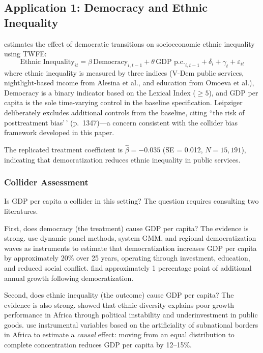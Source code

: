 \documentclass[
]{article}
\begin{document}
\subsection{\texorpdfstring{Application 1: Democracy and Ethnic
Inequality
\label{sec:app_leipziger}}{Application 1: Democracy and Ethnic Inequality }}\label{application-1-democracy-and-ethnic-inequality}

\citet{leipziger2024} estimates the effect of democratic transitions on
socioeconomic ethnic inequality using TWFE: \[
\text{Ethnic Inequality}_{it} = \beta \, \text{Democracy}_{i,t-1} + \theta \, \text{GDP p.c.}_{i,t-1} + \delta_i + \gamma_t + \varepsilon_{it}
\] where ethnic inequality is measured by three indices (V-Dem public
services, nightlight-based income from Alesina et al., and education
from Omoeva et al.), Democracy is a binary indicator based on the
Lexical Index (\(\geq 5\)), and GDP per capita is the sole time-varying
control in the baseline specification. Leipziger deliberately excludes
additional controls from the baseline, citing ``the risk of
posttreatment bias'\,' (p.~1347)---a concern consistent with the
collider bias framework developed in this paper.

The replicated treatment coefficient is \(\hat\beta = -0.035\) (SE =
0.012, \(N = 15,191\)), indicating that democratization reduces ethnic
inequality in public services.

\subsubsection{Collider Assessment}\label{collider-assessment}

Is GDP per capita a collider in this setting? The question requires
consulting two literatures.

First, does democracy (the treatment) cause GDP per capita? The evidence
is strong. \citet{acemoglu_etal2019} use dynamic panel methods, system
GMM, and regional democratization waves as instruments to estimate that
democratization increases GDP per capita by approximately 20\% over 25
years, operating through investment, education, and reduced social
conflict. \citet{papaioannou_siourounis2008} find approximately 1
percentage point of additional annual growth following democratization.

Second, does ethnic inequality (the outcome) cause GDP per capita? The
evidence is also strong. \citet{easterly_levine1997} showed that ethnic
diversity explains poor growth performance in Africa through political
instability and underinvestment in public goods.
\citet{grundler_link2024} use instrumental variables based on the
artificiality of subnational borders in Africa to estimate a
\textit{causal} effect: moving from an equal distribution to complete
concentration reduces GDP per capita by 12--15\%.
\end{document}
